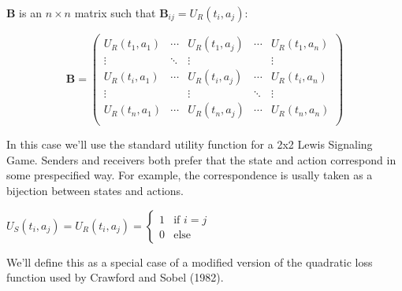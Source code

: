 \documentclass{article}
\begin{document}
$\textbf{B}$ is an $n \times n$ matrix such that
$\textbf{B}_{ij} = U_R(t_i, a_j)$:

\begin{equation}
\textbf{B} =
 \begin{pmatrix}
  U_R(t_1, a_1) & \cdots & U_R(t_1, a_j) & \cdots & U_R(t_1, a_n) \\
  \vdots            & \ddots & \vdots           &           & \vdots \\
  U_R(t_i, a_1) & \cdots & U_R(t_i, a_j) & \cdots & U_R(t_i, a_n) \\  
  \vdots            &  & \vdots           &   \ddots        & \vdots \\
  U_R(t_n, a_1) & \cdots & U_R(t_n, a_j)  & \cdots & U_R(t_n, a_n) \\
 \end{pmatrix}
\end{equation}

    In this case we'll use the standard utility function for a 2x2 Lewis
Signaling Game. Senders and receivers both prefer that the state and
action correspond in some prespecified way. For example, the
correspondence is usally taken as a bijection between states and
actions.

$U_S(t_i,a_j) = U_R(t_i, a_j) = \left\{     \begin{array}{ll}         1  & \mbox{if } i = j \\         0 & \mbox{else}     \end{array} \right. $

We'll define this as a special case of a modified version of the
quadratic loss function used by Crawford and Sobel (1982).
\end{document}
